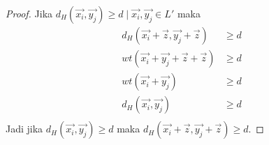 \begin{proof}
Jika $d_H(\vec{x_i},\vec{y_j}) \ge d \mid \vec{x_i},\vec{y_j} \in L'$ maka
\begin{align*}
d_H(\vec{x_i}+\vec{z},\vec{y_j}+\vec{z}) &\ge d \\
wt(\vec{x_i}+\vec{y_j}+\vec{z}+\vec{z}) &\ge d \\
wt(\vec{x_i}+\vec{y_j}) &\ge d \\
d_H(\vec{x_i},\vec{y_j}) &\ge d \\
\end{align*}
Jadi jika $d_H(\vec{x_i},\vec{y_j}) \ge d$ maka $d_H(\vec{x_i}+\vec{z},\vec{y_j}+\vec{z}) \ge d$.
\end{proof}
